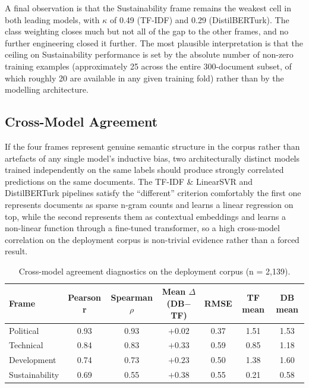 \documentclass[12pt, journal]{IEEEtran}
\begin{document}
A final observation is that the Sustainability frame remains the weakest cell in both leading models, with $\kappa$ of 0.49 (TF-IDF) and 0.29 (DistilBERTurk). The class weighting closes much but not all of the gap to the other frames, and no further engineering closed it further. The most plausible interpretation is that the ceiling on Sustainability performance is set by the absolute number of non-zero training examples (approximately 25 across the entire 300-document subset, of which roughly 20 are available in any given training fold) rather than by the modelling architecture.

\subsection{Cross-Model Agreement}
If the four frames represent genuine semantic structure in the corpus rather than artefacts of any single model's inductive bias, two architecturally distinct models trained independently on the same labels should produce strongly correlated predictions on the same documents. The TF-IDF \& LinearSVR and DistilBERTurk pipelines satisfy the ``different'' criterion comfortably the first one represents documents as sparse n-gram counts and learns a linear regression on top, while the second represents them as contextual embeddings and learns a non-linear function through a fine-tuned transformer, so a high cross-model correlation on the deployment corpus is non-trivial evidence rather than a forced result.

\begin{table}[!ht]
\renewcommand{\arraystretch}{1.3}
\caption{Cross-model agreement diagnostics on the deployment corpus (n = 2,139).}
\label{table_convergent}
\centering
\begin{tabular}{|l|c|c|c|c|c|c|}
\hline
\textbf{Frame} & \textbf{Pearson r} & \textbf{Spearman $\rho$} & \textbf{Mean $\Delta$ (DB$-$TF)} & \textbf{RMSE} & \textbf{TF mean} & \textbf{DB mean} \\
\hline\hline
Political & 0.93 & 0.93 & $+0.02$ & 0.37 & 1.51 & 1.53 \\
\hline
Technical & 0.84 & 0.83 & $+0.33$ & 0.59 & 0.85 & 1.18 \\
\hline
Development & 0.74 & 0.73 & $+0.23$ & 0.50 & 1.38 & 1.60 \\
\hline
Sustainability & 0.69 & 0.55 & $+0.38$ & 0.55 & 0.21 & 0.58 \\
\hline
\end{tabular}
\end{table}
\end{document}
